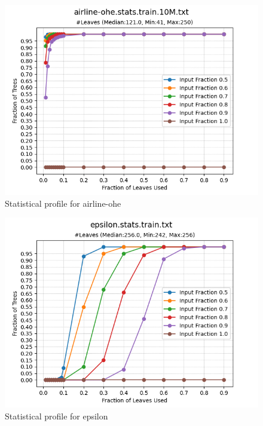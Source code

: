\begin{figure}
    \centering
    \includegraphics[width=\linewidth]{figures/airline-ohe.stats.train.txt.png}
    \caption{Statistical profile for airline-ohe}
    \label{Fig:AirlineOHEStats}
\end{figure}
\begin{figure}
    \centering
    \includegraphics[width=\linewidth]{figures/epsilon.stats.train.txt.png}
    \caption{Statistical profile for epsilon}
    \label{Fig:EpsilonStats}
\end{figure}
